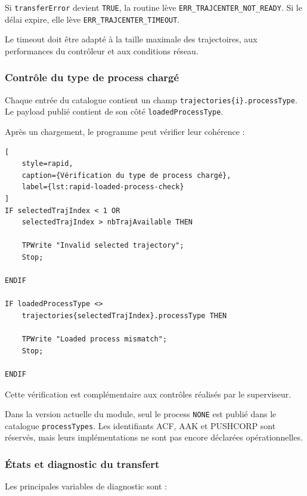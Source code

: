 \documentclass{rapportENSAM}
\begin{document}
Si \texttt{transferError} devient \texttt{TRUE}, la routine lève
\texttt{ERR\_TRAJCENTER\_NOT\_READY}. Si le délai expire, elle lève
\texttt{ERR\_TRAJCENTER\_TIMEOUT}.

Le timeout doit être adapté à la taille maximale des trajectoires, aux
performances du contrôleur et aux conditions réseau.


\subsubsection{Contrôle du type de process chargé}
\label{subsubsec:rapid-loaded-process-check}

Chaque entrée du catalogue contient un champ
\texttt{trajectories\{i\}.processType}. Le payload publié contient de son côté
\texttt{loadedProcessType}.

Après un chargement, le programme peut vérifier leur cohérence :

\begin{lstlisting}[
    style=rapid,
    caption={Vérification du type de process chargé},
    label={lst:rapid-loaded-process-check}
]
IF selectedTrajIndex < 1 OR
    selectedTrajIndex > nbTrajAvailable THEN

    TPWrite "Invalid selected trajectory";
    Stop;

ENDIF

IF loadedProcessType <>
    trajectories{selectedTrajIndex}.processType THEN

    TPWrite "Loaded process mismatch";
    Stop;

ENDIF
\end{lstlisting}

Cette vérification est complémentaire aux contrôles réalisés par le
superviseur.

Dans la version actuelle du module, seul le process \texttt{NONE} est publié
dans le catalogue \texttt{processTypes}. Les identifiants ACF, AAK et PUSHCORP
sont réservés, mais leurs implémentations ne sont pas encore déclarées
opérationnelles.


\subsubsection{États et diagnostic du transfert}
\label{subsubsec:rapid-transfer-errors}

Les principales variables de diagnostic sont :
\end{document}
